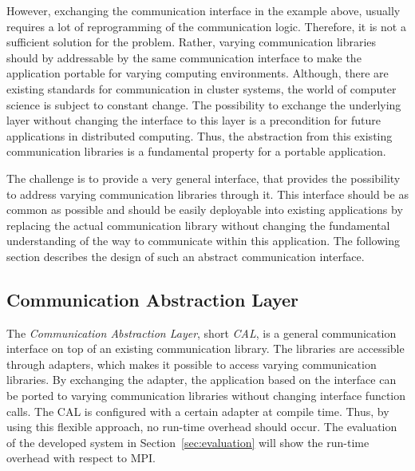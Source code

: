 However, exchanging the communication interface in the example above,
usually requires a lot of reprogramming of the communication logic.
Therefore, it is not a sufficient solution for the problem.  Rather,
varying communication libraries should by addressable by the same
communication interface to make the application portable for varying
computing environments. Although, there are existing standards for
communication in cluster systems, the world of computer science is
subject to constant change.  The possibility to exchange the
underlying layer without changing the interface to this layer is a
precondition for future applications in distributed computing.  Thus,
the abstraction from this existing communication libraries is a
fundamental property for a portable application.

The challenge is to provide a very general interface, that provides
the possibility to address varying communication libraries through it.
This interface should be as common as possible and should be easily
deployable into existing applications by replacing the actual
communication library without changing the fundamental understanding
of the way to communicate within this application. The following
section describes the design of such an abstract communication
interface.


\subsection{Communication Abstraction Layer}
\label{sec:cal}

The \textit{Communication Abstraction Layer}, short \textit{CAL}, is a
general communication interface on top of an existing communication
library. The libraries are accessible through adapters, which makes it
possible to access varying communication libraries. By exchanging the
adapter, the application based on the interface can be ported to
varying communication libraries without changing interface function
calls. The CAL is configured with a certain adapter at compile
time. Thus, by using this flexible approach, no run-time overhead
should occur. The evaluation of the developed system in
Section~\ref{sec:evaluation} will show the run-time overhead with
respect to MPI.

